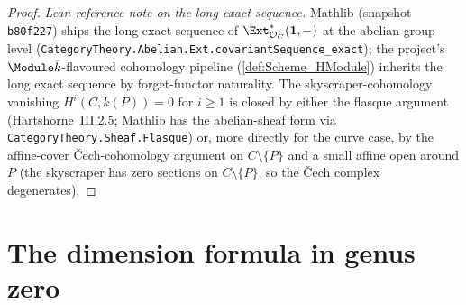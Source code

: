 \begin{proof}
  \emph{Lean reference note on the long exact sequence.} Mathlib
  (snapshot \texttt{b80f227}) ships the long exact sequence of
  \(\Ext_{\mathcal O_C}^*(\mathbf 1, -)\) at the abelian-group level
  (\texttt{CategoryTheory.Abelian.Ext.covariantSequence\_exact}); the
  project's \(\Module \bar k\)-flavoured cohomology pipeline
  (\cref{def:Scheme_HModule}) inherits the long exact sequence by
  forget-functor naturality. The skyscraper-cohomology vanishing
  \(H^i(C, k(P)) = 0\) for \(i \geq 1\) is closed by either the flasque
  argument (Hartshorne~III.2.5; Mathlib has the abelian-sheaf form
  via \texttt{CategoryTheory.Sheaf.Flasque}) or, more directly for the
  curve case, by the affine-cover Čech-cohomology argument on
  \(C \setminus \{P\}\) and a small affine open around \(P\) (the
  skyscraper has zero sections on \(C \setminus \{P\}\), so the Čech
  complex degenerates).
\end{proof}

\section{The dimension formula in genus zero}

